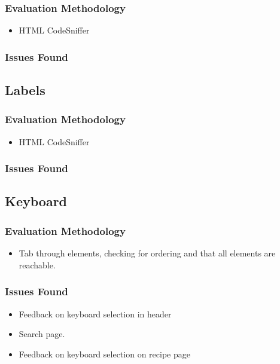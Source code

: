 \subsubsection{Evaluation Methodology}

\begin{itemize}
\item HTML CodeSniffer
\end{itemize}

\subsubsection{Issues Found}

\subsection{Labels}

\subsubsection{Evaluation Methodology}

\begin{itemize}
\item HTML CodeSniffer
\end{itemize}

\subsubsection{Issues Found}

\subsection{Keyboard}

\subsubsection{Evaluation Methodology}

\begin{itemize}
\item Tab through elements, checking for ordering and that all
  elements are reachable.
\end{itemize}

\subsubsection{Issues Found}

\begin{itemize}
\item Feedback on keyboard selection in header
\item Search page.
\item Feedback on keyboard selection on recipe page
\end{itemize}

